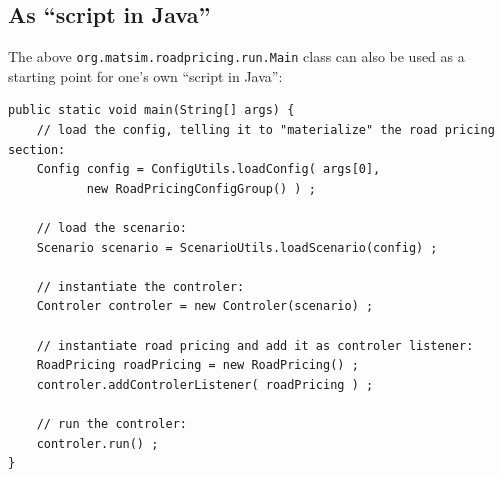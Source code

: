 \subsection{As ``script in Java''}

The above \verb$org.matsim.roadpricing.run.Main$ class can also be used as a starting point for one's own ``script in Java'':
\begin{lstlisting}
public static void main(String[] args) {
	// load the config, telling it to "materialize" the road pricing section:
	Config config = ConfigUtils.loadConfig( args[0], 
           new RoadPricingConfigGroup() ) ;
	
	// load the scenario:
	Scenario scenario = ScenarioUtils.loadScenario(config) ;

	// instantiate the controler:
	Controler controler = new Controler(scenario) ;

	// instantiate road pricing and add it as controler listener:
	RoadPricing roadPricing = new RoadPricing() ;
	controler.addControlerListener( roadPricing ) ;

	// run the controler:
	controler.run() ;
}
\end{lstlisting}




